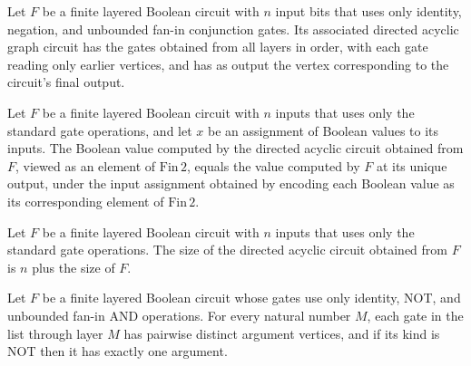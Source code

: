 \begin{definition}
\label{BoolCircuit.LayeredCircuit.toDAG}
\leanok
{}
Let $F$ be a finite layered Boolean circuit with $n$ input bits that uses only identity,
negation, and unbounded fan-in conjunction gates. Its associated directed acyclic graph
circuit has the gates obtained from all layers in order, with each gate reading only
earlier vertices, and has as output the vertex corresponding to the circuit’s final
output.
\end{definition}

\begin{theorem}
\label{BoolCircuit.LayeredCircuit.toDAG_eval}
\leanok
{}
Let $F$ be a finite layered Boolean circuit with $n$ inputs that uses only the standard
gate operations, and let $x$ be an assignment of Boolean values to its inputs. The
Boolean value computed by the directed acyclic circuit obtained from $F$, viewed as an
element of $\mathrm{Fin}\,2$, equals the value computed by $F$ at its unique output,
under the input assignment obtained by encoding each Boolean value as its corresponding
element of $\mathrm{Fin}\,2$.
\end{theorem}

\begin{theorem}
\label{BoolCircuit.LayeredCircuit.toDAG_size}
\leanok
{}
Let $F$ be a finite layered Boolean circuit with $n$ inputs that uses only the standard
gate operations. The size of the directed acyclic circuit obtained from $F$ is $n$ plus
the size of $F$.
\end{theorem}

\begin{theorem}
\label{BoolCircuit.LayeredCircuit.gatesUpTo_wellFormed}
\leanok
{}
Let $F$ be a finite layered Boolean circuit whose gates use only identity, NOT, and
unbounded fan-in AND operations. For every natural number $M$, each gate in the list
through layer $M$ has pairwise distinct argument vertices, and if its kind is NOT then
it has exactly one argument.
\end{theorem}

